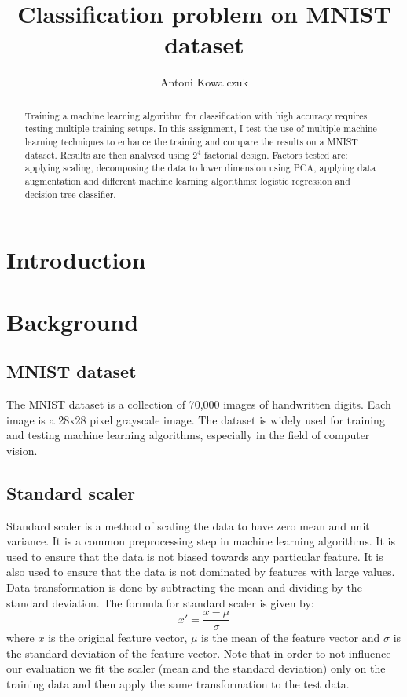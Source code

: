 \documentclass{article}
\title{Classification problem on MNIST dataset}
\author{%
  Antoni Kowalczuk \\
}
\begin{document}
\maketitle


\begin{abstract}
    Training a machine learning algorithm for classification with high accuracy requires testing multiple training setups. In this assignment, I test the use of multiple machine learning techniques to enhance the training and compare the results on a MNIST dataset. Results are then analysed using $2^4$ factorial design. Factors tested are: applying scaling, decomposing the data to lower dimension using PCA, applying data augmentation and different machine learning algorithms: logistic regression and decision tree classifier.
\end{abstract}


\section{Introduction}

\section{Background}

\subsection{MNIST dataset}
The MNIST dataset is a collection of 70,000 images of handwritten digits. Each image is a 28x28 pixel grayscale image. The dataset is widely used for training and testing machine learning algorithms, especially in the field of computer vision.

\subsection{Standard scaler}
\label{subsec:standard_scaler}
Standard scaler is a method of scaling the data to have zero mean and unit variance. It is a common preprocessing step in machine learning algorithms. It is used to ensure that the data is not biased towards any particular feature. It is also used to ensure that the data is not dominated by features with large values. Data transformation is done by subtracting the mean and dividing by the standard deviation. The formula for standard scaler is given by:
\begin{equation}
    x' = \frac{x - \mu}{\sigma}
\end{equation}
where $x$ is the original feature vector, $\mu$ is the mean of the feature vector and $\sigma$ is the standard deviation of the feature vector. Note that in order to not influence our evaluation we fit the scaler (mean and the standard deviation) only on the training data and then apply the same transformation to the test data.
\end{document}
